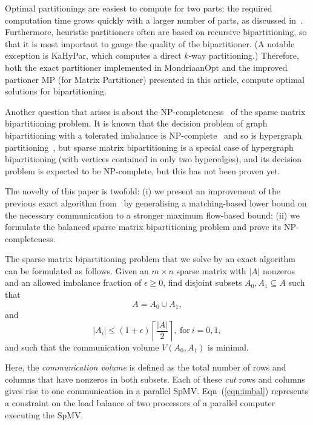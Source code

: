 Optimal partitionings are easiest to compute for two parts:
the required computation time
grows quickly with a larger number of parts, as discussed in~\cite{pelt15}.
Furthermore, heuristic partitioners often are based on recursive bipartitioning,
so that it is most important to gauge the quality of the bipartitioner.
(A notable exception is KaHyPar, which computes a direct $k$-way partitioning.)
Therefore, both the exact partitioner implemented in MondriaanOpt and the improved partioner 
MP (for Matrix Partitioner)
presented in this article, compute optimal solutions for bipartitioning.

Another question that arises is about the NP-completeness~\cite{garey79}
of the sparse matrix bipartitioning problem.
It is known that the decision problem of
graph bipartitioning with a tolerated imbalance
is NP-complete~\cite[Theorem 3.1]{bui92}
and so is hypergraph partitioning~\cite[Chapter 6]{lengauer90}, 
but sparse matrix bipartitioning is a special
case of hypergraph bipartitioning (with vertices contained in only two hyperedges),
and its decision problem is expected to be NP-complete,
but this has not been proven yet.

The novelty of this paper is twofold: (i) we present an improvement
of the previous exact algorithm from~\cite{pelt15} by generalising
a matching-based lower bound on the necessary communication
to a stronger maximum flow-based bound; (ii) we formulate the balanced sparse matrix bipartitioning problem
and prove its NP-completeness.

The sparse matrix bipartitioning problem that
we solve by an exact algorithm can be formulated as follows.
Given an $m \times n$ sparse matrix with $|A|$ nonzeros
and an allowed imbalance fraction of $\epsilon \geq 0$,
find disjoint subsets $A_0, A_1 \subseteq A$ such that
\begin{equation}
A=A_0 \cup A_1,
\end{equation}
and
\begin{equation}
\label{eqn:imbal}
|A_i| \leq (1+\epsilon ) \left\lceil \frac{|A|}{2} \right\rceil ,
~\mathrm{for}~ i=0,1,
\end{equation}
and such that the communication volume $V(A_0,A_1)$ is minimal.

Here, the \emph{communication volume} is
defined as the total number of rows and columns 
that have nonzeros in both subsets.
Each of these \emph{cut} rows and columns gives rise to one communication
in a parallel SpMV.
Eqn~(\ref{eqn:imbal}) represents a constraint on the load balance
of two processors of a parallel computer executing the SpMV. 

